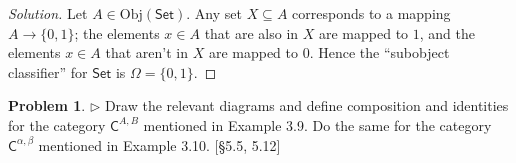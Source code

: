 \documentclass[fontsize=14pt]{scrartcl}
\theoremstyle{definition}
\newtheorem{problem-internal}{Problem}[subsection]
\newenvironment{problem}{
  \medskip
  \begin{problem-internal}
}{
  \end{problem-internal}
}
\newenvironment{solution}{
  \begin{proof}[Solution]
  \vspace{-8px}
  \setlength{\parskip}{4px}
  \setlength{\parindent}{0px}
}{
  \end{proof}
}
\newcommand{\Obj}{\mathrm{Obj}}
\begin{document}
\begin{solution}
\def \C {\mathsf{C}}
\def \Set {\mathsf{Set}}

Let $A\in\Obj(\Set)$. Any set $X\subseteq A$ corresponds to a mapping
$A\to\{0,1\}$; the elements $x\in A$ that are also in $X$ are mapped to $1$, and
the elements $x\in A$ that aren't in $X$ are mapped to $0$. Hence the
``subobject classifier'' for $\Set$ is $\Omega=\{0,1\}$.
\end{solution}


\begin{problem}
\def \C {\mathsf{C}}

$\rhd$ Draw the relevant diagrams and define composition and identities for the
category $\C^{A,B}$ mentioned in Example 3.9. Do the same for the category
$\C^{\alpha,\beta}$ mentioned in Example 3.10. [\S5.5, 5.12]
\end{problem}
\end{document}

